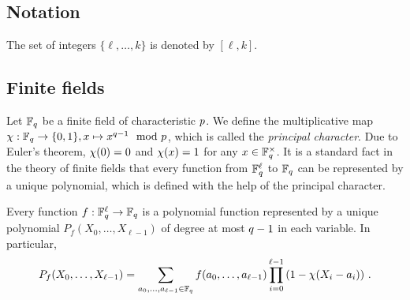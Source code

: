 \subsection{Notation}
	The set of integers $\{\ell,\dots,k\}$ is denoted by $[\ell,k]$.

\subsection{Finite fields}
	Let $\mathbb{F}_q$ be a finite field of characteristic $p$.
	We define the multiplicative map $\chi: \mathbb{F}_q \rightarrow \{0,1\}, x \mapsto x^{q-1} \mod {p}$, which is called the \emph{principal character}.
	Due to Euler's theorem, $\chi(0) = 0$ and $\chi(x) = 1$ for any $x \in \mathbb{F}_q^\times$.
	It is a standard fact in the theory of finite fields that every function from $\mathbb{F}_q^\ell$ to $\mathbb{F}_q$ can be represented by a unique polynomial, which is defined with the help of the principal character. 
	\begin{lemma}\label{lem:interpolation}
		Every function $f: \mathbb{F}_q^\ell \rightarrow \mathbb{F}_q$ is a polynomial function represented by a unique polynomial $P_f(X_0,\dots,X_{\ell-1})$ of degree at most $q-1$ in each variable.
		In particular,
		\begin{align*}
			P_f(X_0,\dots,X_{\ell-1}) = \sum_{a_0,\dots,a_{\ell-1} \in \mathbb{F}_q} f(a_0,\dots,a_{\ell-1}) \prod_{i=0}^{\ell-1} \left(1 - \chi(X_i - a_i)\right)\,.
		\end{align*}
	\end{lemma}
